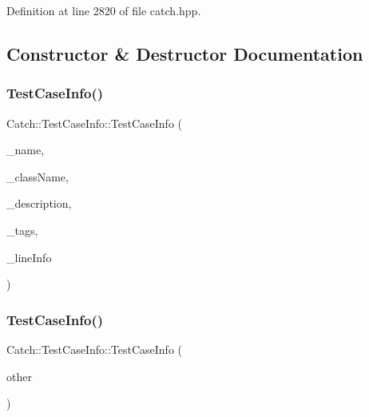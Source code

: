 Definition at line 2820 of file catch.\+hpp.



\subsection{Constructor \& Destructor Documentation}
\hypertarget{struct_catch_1_1_test_case_info_a35ec65315e0d1f178491b5a59f3f3123}{}\label{struct_catch_1_1_test_case_info_a35ec65315e0d1f178491b5a59f3f3123} 
\subsubsection{\texorpdfstring{Test\+Case\+Info()}{TestCaseInfo()}\hspace{0.1cm}{\footnotesize\ttfamily [1/2]}}
{\footnotesize\ttfamily Catch\+::\+Test\+Case\+Info\+::\+Test\+Case\+Info (\begin{DoxyParamCaption}\item[{std\+::string const \&}]{\+\_\+name,  }\item[{std\+::string const \&}]{\+\_\+class\+Name,  }\item[{std\+::string const \&}]{\+\_\+description,  }\item[{std\+::set$<$ std\+::string $>$ const \&}]{\+\_\+tags,  }\item[{\hyperlink{struct_catch_1_1_source_line_info}{Source\+Line\+Info} const \&}]{\+\_\+line\+Info }\end{DoxyParamCaption})}

\hypertarget{struct_catch_1_1_test_case_info_ac338adb4e38f4bf3977fb45b2b1fe447}{}\label{struct_catch_1_1_test_case_info_ac338adb4e38f4bf3977fb45b2b1fe447} 
\subsubsection{\texorpdfstring{Test\+Case\+Info()}{TestCaseInfo()}\hspace{0.1cm}{\footnotesize\ttfamily [2/2]}}
{\footnotesize\ttfamily Catch\+::\+Test\+Case\+Info\+::\+Test\+Case\+Info (\begin{DoxyParamCaption}\item[{\hyperlink{struct_catch_1_1_test_case_info}{Test\+Case\+Info} const \&}]{other }\end{DoxyParamCaption})}



